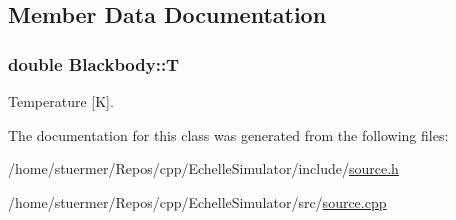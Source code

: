 \subsection{Member Data Documentation}
\subsubsection[{\texorpdfstring{T}{T}}]{\setlength{\rightskip}{0pt plus 5cm}double Blackbody\+::T\hspace{0.3cm}{\ttfamily [private]}}\hypertarget{class_blackbody_ab565e14b93a8459ebbd4e2c5583932f0}{}\label{class_blackbody_ab565e14b93a8459ebbd4e2c5583932f0}


Temperature \mbox{[}K\mbox{]}. 



The documentation for this class was generated from the following files\+:\begin{DoxyCompactItemize}
\item 
/home/stuermer/\+Repos/cpp/\+Echelle\+Simulator/include/\hyperlink{source_8h}{source.\+h}\item 
/home/stuermer/\+Repos/cpp/\+Echelle\+Simulator/src/\hyperlink{source_8cpp}{source.\+cpp}\end{DoxyCompactItemize}
